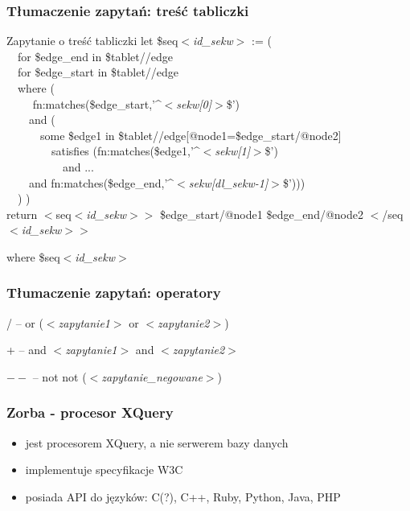 \begin{frame}
 \frametitle{Tłumaczenie zapytań: treść tabliczki}
  \begin{block}{Zapytanie o treść tabliczki}
	let \$seq\textit{$<$id\_sekw$>$} := (\\
  ~~for \$edge\_end in \$tablet//edge\\
  ~~for \$edge\_start in \$tablet//edge\\
~~where (\\
~~~~ fn:matches(\$edge\_start,'\textasciicircum \textit{$<$sekw[0]$>$}\$')\\
~~~~and (\\
~~~~~~some \$edge1 in \$tablet//edge[@node1=\$edge\_start/@node2]\\
~~~~~~~~satisfies (fn:matches(\$edge1,'\textasciicircum \textit{$<$sekw[1]$>$}\$')\\
~~~~~~~~~~and ... \\
~~~~and fn:matches(\$edge\_end,'\textasciicircum \textit{$<$sekw[dl\_sekw-1]$>$}\$')))\\
~~) )\\
return $<$seq\textit{$<$id\_sekw$>$}$>$ {\$edge\_start/@node1} {\$edge\_end/@node2} $<$/seq\textit{$<$id\_sekw$>$}$>$
\end{block}
\begin{block}{where}
	\$seq\textit{$<$id\_sekw$>$}
\end{block}
\end{frame}





\begin{frame}
 \frametitle{Tłumaczenie zapytań: operatory}
\begin{block}{/ -- or}
(\textit{$<$zapytanie1$>$} or \textit{$<$zapytanie2$>$})\\
\end{block}
\begin{block}{+ -- and}
\textit{$<$zapytanie1$>$} and \textit{$<$zapytanie2$>$}\\
\end{block}
\begin{block}{$--$ -- not}
not (\textit{$<$zapytanie\_negowane$>$})\\
\end{block}
\end{frame}

\begin{frame}
 \frametitle{Zorba - procesor XQuery}
\begin{itemize}
\item jest procesorem XQuery, a nie serwerem bazy danych
\item implementuje specyfikacje W3C
\item posiada API do języków: C(?), C++, Ruby, Python, Java, PHP
\end{itemize}
 \end{frame}

